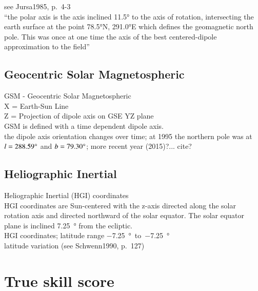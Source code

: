 see Jursa1985, p.~4-3\\
``the polar axis is the axis inclined 11.5° to the axis of rotation, intersecting the earth surface at the point 78.5°N, 291.0°E which defines the geomagnetic north pole. This was once at one time the axis of the best centered-dipole approximation to the field''\\


\subsection*{Geocentric Solar Magnetospheric}

GSM - Geocentric Solar Magnetospheric\\
X = Earth-Sun Line\\
Z = Projection of dipole axis on GSE YZ plane\\

GSM is defined with a time dependent dipole axis.\\
the dipole axis orientation changes over time; at 1995 the northern pole was at $l = 288.59\degree$ and $b = 79.30\degree$; more recent year (2015)?... cite?\\

\subsection*{Heliographic Inertial}

Heliographic Inertial (HGI) coordinates\\
HGI coordinates are Sun-centered with the z-axis directed along the solar rotation axis and directed northward of the solar equator. The solar equator plane is inclined \SI{7.25}{\degree} from the ecliptic.\\

HGI coordinates; latitude range \SI{-7.25}{\degree}~to~\SI{-7.25}{\degree}\\
latitude variation (see Schwenn1990, p.~127)\\


\section{True skill score}
\label{sec:true_skill_score}

